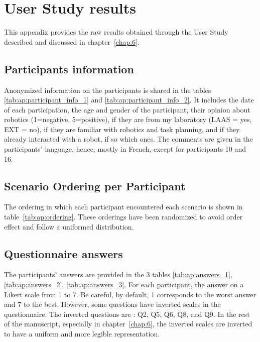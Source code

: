 \newpage
\thispagestyle{empty}
\mbox{}

\chapter{User Study results}
\label{ap:study}

This appendix provides the raw results obtained through the User Study described and discussed in chapter~\ref{chap:6}.

\section{Participants information}

Anonymized information on the participants is shared in the tables \ref{tab:ap:participant_info_1} and \ref{tab:ap:participant_info_2}. It includes the date of each participation, the age and gender of the participant, their opinion about robotics (1=negative, 5=positive), if they are from my laboratory (LAAS = yes, EXT = no), if they are familiar with robotics and task planning, and if they already interacted with a robot, if so which ones. The comments are given in the participants' language, hence, mostly in French, except for participants 10 and 16. 

\section{Scenario Ordering per Participant}

The ordering in which each participant encountered each scenario is shown in table~\ref{tab:ap:ordering}. These orderings have been randomized to avoid order effect and follow a uniformed distribution.

\section{Questionnaire answers}

The participants' answers are provided in the 3 tables \ref{tab:ap:answers_1}, \ref{tab:ap:answers_2}, \ref{tab:ap:answers_3}. For each participant, the answer on a
Likert scale from 1 to 7. Be careful, by default, 1 corresponds to the worst answer and 7 to the best. However, some questions have inverted scales in the questionnaire. The inverted questions are : Q2, Q5, Q6, Q8, and Q9. In the rest of the manuscript, especially in chapter~\ref{chap:6}, the inverted scales are inverted to have a uniform and more legible representation. 

